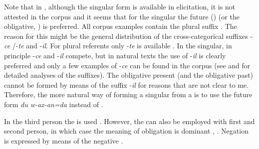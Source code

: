 Note that in , although the singular form  is available in elicitation, it is not attested in the corpus and it seems that for the singular the future () (or the obligative, ) is preferred. All corpus examples contain the plural suffix . The reason for this might be the general distribution of the cross-categorical suffixes -\textit{ce} /-\textit{te} and -\textit{il}. For plural referents only -\textit{te} is available . In the singular, in principle -\textit{ce} and -\textit{il} compete, but in natural texts the use of -\textit{il} is clearly preferred and only a few examples of -\textit{ce} can be found in the corpus (see  and  for detailed analyses of the suffixes). The obligative present (and the obligative past) cannot be formed by means of the suffix -\textit{il} for reasons that are not clear to me. Therefore, the more natural way of forming a singular from a   is to use the future form \textit{du w-ax-an=da} instead of .

In the third person the  is used . However, the  can also be employed with first and second person, in which case the meaning of obligation is dominant , . Negation is expressed by means of the negative  .


